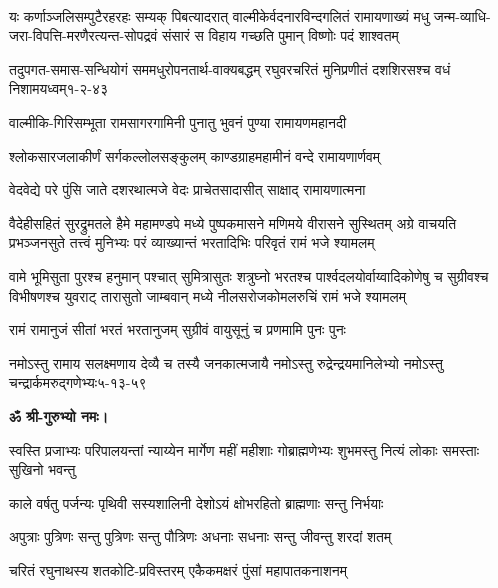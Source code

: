 \mbox{}\\
\resetShloka
{}

\fourlineindentedshloka
{यः कर्णाञ्जलिसम्पुटैरहरहः सम्यक् पिबत्यादरात्}
{वाल्मीकेर्वदनारविन्दगलितं रामायणाख्यं मधु}
{जन्म-व्याधि-जरा-विपत्ति-मरणैरत्यन्त-सोपद्रवं}
{संसारं स विहाय गच्छति पुमान् विष्णोः पदं शाश्वतम्}

\annofourlineindentedshloka
{तदुपगत-समास-सन्धियोगं}
{सममधुरोपनतार्थ-वाक्यबद्धम्}
{रघुवरचरितं मुनिप्रणीतं}
{दशशिरसश्च वधं निशामयध्वम्}{१-२-४३}

\twolineshloka
{वाल्मीकि-गिरिसम्भूता रामसागरगामिनी}
{पुनातु भुवनं पुण्या रामायणमहानदी}

\twolineshloka
{श्लोकसारजलाकीर्णं सर्गकल्लोलसङ्कुलम्}
{काण्डग्राहमहामीनं वन्दे रामायणार्णवम्}

\twolineshloka
{वेदवेद्ये परे पुंसि जाते दशरथात्मजे}
{वेदः प्राचेतसादासीत् साक्षाद् रामायणात्मना}

\resetShloka
{}

\fourlineindentedshloka
{वैदेहीसहितं सुरद्रुमतले हैमे महामण्डपे}
{मध्ये पुष्पकमासने मणिमये वीरासने सुस्थितम्}
{अग्रे वाचयति प्रभञ्जनसुते तत्त्वं मुनिभ्यः परं}
{व्याख्यान्तं भरतादिभिः परिवृतं रामं भजे श्यामलम्}

\fourlineindentedshloka
{वामे भूमिसुता पुरश्च हनुमान् पश्चात् सुमित्रासुतः}
{शत्रुघ्नो भरतश्च पार्श्वदलयोर्वाय्वादिकोणेषु च}
{सुग्रीवश्च विभीषणश्च युवराट् तारासुतो जाम्बवान्}
{मध्ये नीलसरोजकोमलरुचिं रामं भजे श्यामलम्}

\twolineshloka
{रामं रामानुजं सीतां भरतं भरतानुजम्}
{सुग्रीवं वायुसूनुं च प्रणमामि पुनः पुनः}

\annofourlineindentedshloka
{नमोऽस्तु रामाय सलक्ष्मणाय}
{देव्यै च तस्यै जनकात्मजायै}
{नमोऽस्तु रुद्रेन्द्रयमानिलेभ्यो}
{नमोऽस्तु चन्द्रार्कमरुद्गणेभ्यः}{५-१३-५९}

\centerline{\textbf{ॐ श्री-गुरुभ्यो नमः।}}

\resetShloka
{}
\fourlineindentedshloka
{स्वस्ति प्रजाभ्यः परिपालयन्तां}
{न्याय्येन मार्गेण महीं महीशाः}
{गोब्राह्मणेभ्यः शुभमस्तु नित्यं}
{लोकाः समस्ताः सुखिनो भवन्तु}

\twolineshloka
{काले वर्षतु पर्जन्यः पृथिवी सस्यशालिनी}
{देशोऽयं क्षोभरहितो ब्राह्मणाः सन्तु निर्भयाः}

\twolineshloka
{अपुत्राः पुत्रिणः सन्तु पुत्रिणः सन्तु पौत्रिणः}
{अधनाः सधनाः सन्तु जीवन्तु शरदां शतम्}

\twolineshloka
{चरितं रघुनाथस्य शतकोटि-प्रविस्तरम्}
{एकैकमक्षरं पुंसां महापातकनाशनम्}

